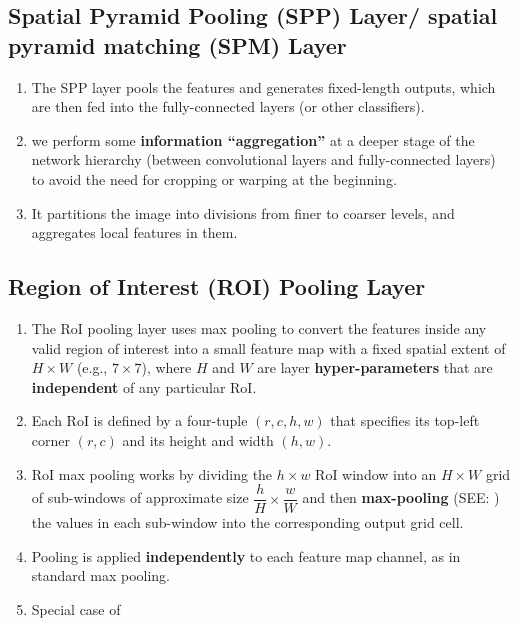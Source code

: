 \subsection{Spatial Pyramid Pooling (SPP) Layer/ spatial pyramid matching (SPM) Layer \cite{arxiv/1406.4729-sppnet}}\label{Spatial Pyramid Pooling (SPP) Layer/ spatial pyramid matching (SPM) Layer}

\begin{enumerate}
    \item The SPP layer pools the features and generates fixed-length outputs, which are then fed into the fully-connected layers (or other classifiers).

    \item we perform some \textbf{information “aggregation”} at a deeper stage of the network hierarchy (between convolutional layers and fully-connected layers) to avoid the need for cropping or warping at the beginning.

    \item  It partitions the image into divisions from finer to coarser levels, and aggregates local features in them.

    
\end{enumerate}



\subsection{Region of Interest (ROI) Pooling Layer \cite{arxiv/1504.08083-fast-rcnn}}\label{cnn: Region of Interest (ROI) Pooling Layer}

\begin{enumerate}
    \item The RoI pooling layer uses max pooling to convert the features inside any valid region of interest into a small feature map with a fixed spatial extent of $H \times W$ (e.g., $7 \times 7$), where $H$ and $W$ are layer \textbf{hyper-parameters} that are \textbf{independent} of any particular RoI.

    \item Each RoI is defined by a four-tuple $(r, c, h, w)$ that specifies its top-left corner $(r, c)$ and its height and width $(h, w)$.

    \item RoI max pooling works by dividing the $h \times w$ RoI window into an $H \times W$ grid of sub-windows of approximate size ${\displaystyle \dfrac{h}{H} \times \dfrac{w}{W}}$ and then \textbf{max-pooling} (SEE: ) the values in each sub-window into the corresponding output grid cell.

    \item Pooling is applied \textbf{independently} to each feature map channel, as in standard max pooling. 

    \item Special case of 
\end{enumerate}


